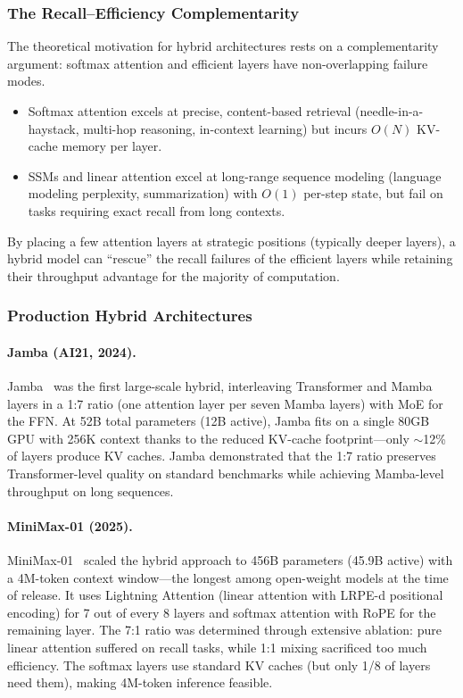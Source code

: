 \subsubsection{The Recall--Efficiency Complementarity}

The theoretical motivation for hybrid architectures rests on a complementarity argument: softmax attention and efficient layers have non-overlapping failure modes.
\begin{itemize}[nosep]
\item Softmax attention excels at precise, content-based retrieval (needle-in-a-haystack, multi-hop reasoning, in-context learning) but incurs $O(N)$ KV-cache memory per layer.
\item SSMs and linear attention excel at long-range sequence modeling (language modeling perplexity, summarization) with $O(1)$ per-step state, but fail on tasks requiring exact recall from long contexts.
\end{itemize}
By placing a few attention layers at strategic positions (typically deeper layers), a hybrid model can ``rescue'' the recall failures of the efficient layers while retaining their throughput advantage for the majority of computation.

\subsubsection{Production Hybrid Architectures}

\paragraph{Jamba (AI21, 2024).}
Jamba~\cite{lieber2024jamba_tr} was the first large-scale hybrid, interleaving Transformer and Mamba layers in a 1:7 ratio (one attention layer per seven Mamba layers) with MoE for the FFN. At 52B total parameters (12B active), Jamba fits on a single 80GB GPU with 256K context thanks to the reduced KV-cache footprint---only $\sim$12\% of layers produce KV caches. Jamba demonstrated that the 1:7 ratio preserves Transformer-level quality on standard benchmarks while achieving Mamba-level throughput on long sequences.

\paragraph{MiniMax-01 (2025).}
MiniMax-01~\cite{minimax2025} scaled the hybrid approach to 456B parameters (45.9B active) with a 4M-token context window---the longest among open-weight models at the time of release. It uses Lightning Attention (linear attention with LRPE-d positional encoding) for 7 out of every 8 layers and softmax attention with RoPE for the remaining layer. The 7:1 ratio was determined through extensive ablation: pure linear attention suffered on recall tasks, while 1:1 mixing sacrificed too much efficiency. The softmax layers use standard KV caches (but only 1/8 of layers need them), making 4M-token inference feasible.

